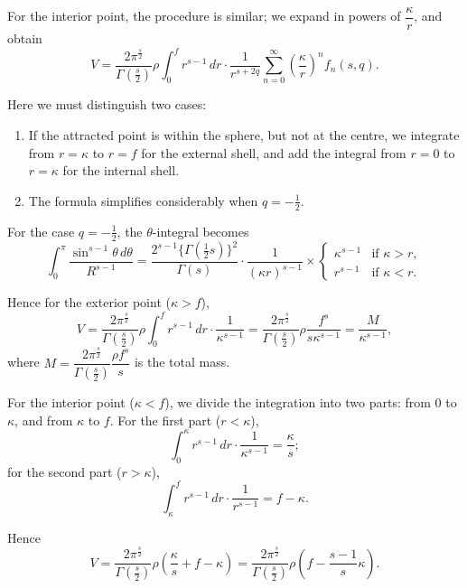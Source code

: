 \documentclass[11pt,a4paper]{book}
\begin{document}
\begin{art}\label{art:68}
For the interior point, the procedure is similar; we expand in powers of $\dfrac{\kappa}{r}$, and obtain
\[
V = \frac{2\pi^{\frac{s}{2}}}{\Gamma(\frac{s}{2})} \rho \int_0^f r^{s-1} \, dr \cdot \frac{1}{r^{s+2q}} \sum_{n=0}^\infty \left(\frac{\kappa}{r}\right)^n f_n(s,q).
\]

Here we must distinguish two cases:
\begin{enumerate}[label=\arabic*.]
\item If the attracted point is within the sphere, but not at the centre, we integrate from $r = \kappa$ to $r = f$ for the external shell, and add the integral from $r = 0$ to $r = \kappa$ for the internal shell.
\item The formula simplifies considerably when $q = -\tfrac{1}{2}$.
\end{enumerate}
\end{art}

\begin{art}\label{art:69}
For the case $q = -\tfrac{1}{2}$, the $\theta$-integral becomes
\[
\int_0^\pi \frac{\sin^{s-1}\theta \, d\theta}{R^{s-1}} = \frac{2^{s-1}\{\Gamma(\frac{1}{2}s)\}^2}{\Gamma(s)} \cdot \frac{1}{(\kappa r)^{s-1}} \times \begin{cases} \kappa^{s-1} & \text{if } \kappa > r, \\ r^{s-1} & \text{if } \kappa < r. \end{cases}
\]

Hence for the exterior point ($\kappa > f$),
\[
V = \frac{2\pi^{\frac{s}{2}}}{\Gamma(\frac{s}{2})} \rho \int_0^f r^{s-1} \, dr \cdot \frac{1}{\kappa^{s-1}} = \frac{2\pi^{\frac{s}{2}}}{\Gamma(\frac{s}{2})} \rho \frac{f^s}{s\kappa^{s-1}} = \frac{M}{\kappa^{s-1}},
\]
where $M = \dfrac{2\pi^{\frac{s}{2}}}{\Gamma(\frac{s}{2})} \dfrac{\rho f^s}{s}$ is the total mass.
\end{art}

\begin{art}\label{art:70}
For the interior point ($\kappa < f$), we divide the integration into two parts: from $0$ to $\kappa$, and from $\kappa$ to $f$. For the first part ($r < \kappa$),
\[
\int_0^\kappa r^{s-1} \, dr \cdot \frac{1}{\kappa^{s-1}} = \frac{\kappa}{s};
\]
for the second part ($r > \kappa$),
\[
\int_\kappa^f r^{s-1} \, dr \cdot \frac{1}{r^{s-1}} = f - \kappa.
\]

Hence
\[
V = \frac{2\pi^{\frac{s}{2}}}{\Gamma(\frac{s}{2})} \rho \left(\frac{\kappa}{s} + f - \kappa\right) = \frac{2\pi^{\frac{s}{2}}}{\Gamma(\frac{s}{2})} \rho \left(f - \frac{s-1}{s}\kappa\right).
\]
\end{art}
\end{document}
